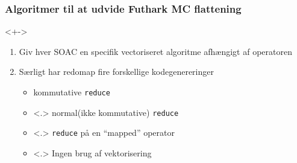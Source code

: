 \documentclass[t]{beamer}
\begin{document}

\begin{frame}
  \frametitle{Algoritmer til at udvide Futhark MC flattening}
  <+->
  \begin{enumerate}
  \item<+-> Giv hver SOAC en specifik vectoriseret algoritme afhængigt af operatoren
  \item<+-> Særligt har redomap fire forskellige kodegenereringer
    \begin{itemize}
    \item<+-> kommutative \texttt{reduce}
    \item<.> normal(ikke kommutative) \texttt{reduce}
    \item<.> \texttt{reduce} på en ``mapped'' operator
    \item<.> Ingen brug af vektorisering
    \end{itemize}
  \end{enumerate}
\end{frame}
\end{document}

